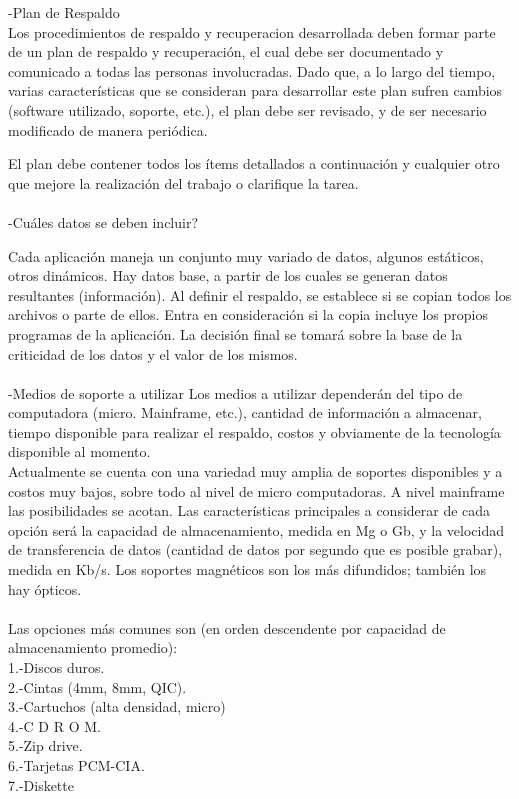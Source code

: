\documentclass[12pt,letterpaper]{article}
\begin{document}
-Plan de Respaldo \\ 
Los procedimientos de respaldo y recuperacion desarrollada deben formar parte de un plan de respaldo y recuperación, el cual debe ser documentado y comunicado a todas las personas involucradas. Dado que, a lo largo del tiempo, varias características que se consideran para desarrollar este plan sufren cambios (software utilizado, soporte,
etc.), el plan debe ser revisado, y de ser necesario modificado de manera periódica. 
 
El plan debe contener todos los ítems detallados a continuación y cualquier otro que mejore la realización del trabajo o clarifique la tarea. \\\\


-Cuáles datos se deben incluir? 
 
Cada aplicación maneja un conjunto muy variado de datos, algunos estáticos, otros dinámicos. Hay datos base, a partir de los cuales se generan datos resultantes (información). Al definir el respaldo, se establece si se copian todos los archivos o parte de ellos. Entra en consideración si la copia incluye los propios programas de la aplicación. La decisión final se tomará sobre la base de la criticidad de los datos y el valor de los mismos.  \\\\


-Medios de soporte a utilizar 
 Los medios a utilizar dependerán del tipo de computadora (micro. Mainframe, etc.), cantidad de información a almacenar, tiempo disponible para realizar el respaldo, costos y obviamente de la tecnología disponible al momento. \\
 Actualmente se cuenta con una variedad muy amplia de soportes disponibles y a costos muy bajos, sobre todo al nivel de micro computadoras. A nivel mainframe las posibilidades se acotan. Las características principales a considerar de cada opción será la capacidad de almacenamiento, medida en Mg o Gb, y la velocidad de transferencia de datos (cantidad de datos por segundo que es posible grabar), medida en Kb/s. Los soportes magnéticos son los más difundidos; también los hay ópticos.  \\\\

Las opciones más comunes son (en orden descendente por capacidad de almacenamiento promedio): \\ 
1.-Discos duros.\\
2.-Cintas (4mm, 8mm, QIC).\\
3.-Cartuchos (alta densidad, micro)\\
4.-C D R O M.\\
5.-Zip drive.\\
6.-Tarjetas PCM-CIA.\\
7.-Diskette  \\\\
\end{document}
